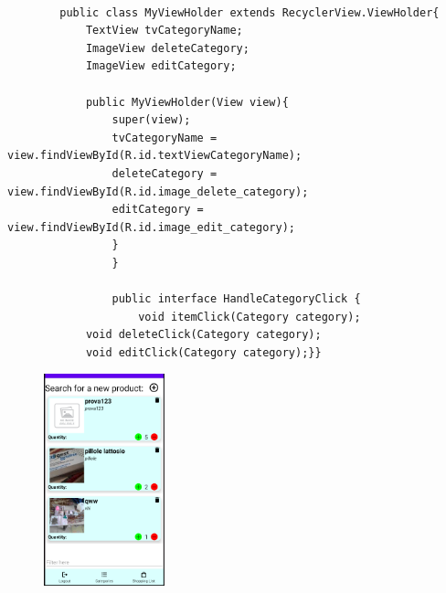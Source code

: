 \documentclass[12pt]{article}
\begin{document}
    \begin{lstlisting}
        
        public class MyViewHolder extends RecyclerView.ViewHolder{
            TextView tvCategoryName;
            ImageView deleteCategory;
            ImageView editCategory;
                            
            public MyViewHolder(View view){
                super(view);
                tvCategoryName = view.findViewById(R.id.textViewCategoryName);
                deleteCategory = view.findViewById(R.id.image_delete_category);
                editCategory = view.findViewById(R.id.image_edit_category);
                }
                }
                
                public interface HandleCategoryClick {
                    void itemClick(Category category);
            void deleteClick(Category category);
            void editClick(Category category);}}
        \end{lstlisting}
        \begin{figure}
            \includegraphics[width=3.5cm]{img/productlist.PNG}
        \end{figure}
\end{document}

